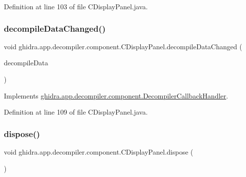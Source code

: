 Definition at line 103 of file C\+Display\+Panel.\+java.

\mbox{\label{classghidra_1_1app_1_1decompiler_1_1component_1_1_c_display_panel_a8c898c24d701d88232c06d4124523790}} 
\subsubsection{\texorpdfstring{decompileDataChanged()}{decompileDataChanged()}}
{\footnotesize\ttfamily void ghidra.\+app.\+decompiler.\+component.\+C\+Display\+Panel.\+decompile\+Data\+Changed (\begin{DoxyParamCaption}\item[{\mbox{\hyperlink{classghidra_1_1app_1_1decompiler_1_1component_1_1_decompile_data}{Decompile\+Data}}}]{decompile\+Data }\end{DoxyParamCaption})\hspace{0.3cm}{\ttfamily [inline]}}



Implements \mbox{\hyperlink{interfaceghidra_1_1app_1_1decompiler_1_1component_1_1_decompiler_callback_handler_a317fd8c2d45cf2bef9ab0e15f4f7ed30}{ghidra.\+app.\+decompiler.\+component.\+Decompiler\+Callback\+Handler}}.



Definition at line 109 of file C\+Display\+Panel.\+java.

\mbox{\label{classghidra_1_1app_1_1decompiler_1_1component_1_1_c_display_panel_a41f19bb88aed7b6a4714a2ea905c2648}} 
\subsubsection{\texorpdfstring{dispose()}{dispose()}}
{\footnotesize\ttfamily void ghidra.\+app.\+decompiler.\+component.\+C\+Display\+Panel.\+dispose (\begin{DoxyParamCaption}{ }\end{DoxyParamCaption})\hspace{0.3cm}{\ttfamily [inline]}}



